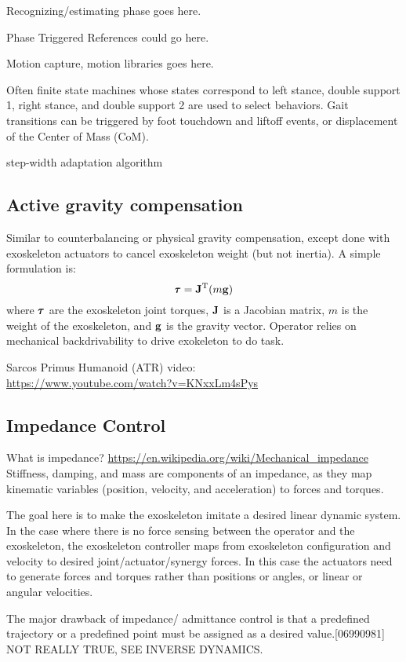 \documentclass[letterpaper,12pt,fullpage]{article}
\begin{document}
Recognizing/estimating phase goes here.

Phase Triggered References could go here.

Motion capture, motion libraries goes here.

Often finite state machines whose states correspond to left stance, double support 1,
right stance, and double support 2 are used to select behaviors. Gait transitions
can be triggered by foot touchdown and liftoff events, or
displacement of the Center of Mass (CoM).

step-width adaptation algorithm

\subsection{Active gravity compensation}

Similar to counterbalancing or physical gravity compensation, except done
with exoskeleton actuators to cancel exoskeleton weight (but not inertia).
A simple formulation is:
\begin{equation}
\vtau = \mJ^{\tr} (m\vg)
\end{equation}
where $\vtau$ are the exoskeleton joint torques, 
${\bf J}$ is a Jacobian matrix, $m$ is the weight of the exoskeleton,
and ${\bf g}$ is the gravity vector. 
Operator relies on mechanical backdrivability to drive
exokeleton to do task.

Sarcos Primus Humanoid (ATR) video:\\
\url{https://www.youtube.com/watch?v=KNxxLm4sPys}

\subsection{Impedance Control}

What is impedance?
\url{https://en.wikipedia.org/wiki/Mechanical_impedance}
Stiffness, damping, and mass are components of an impedance, as
they map kinematic variables (position, velocity, and acceleration)
to forces and torques.

The goal here is to make the exoskeleton imitate a desired linear dynamic system.
In the case where there is no force sensing between the operator and the
exoskeleton, the exoskeleton controller maps from exoskeleton configuration
and velocity to desired joint/actuator/synergy forces.
In this case the actuators need to generate forces and torques rather than
positions or angles, or linear or angular velocities.

The major drawback of impedance/ admittance control
is that a predefined trajectory or a predefined point must be
assigned as a desired value.[06990981] NOT REALLY TRUE, SEE INVERSE DYNAMICS.
\end{document}
